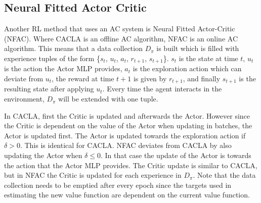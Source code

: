 
\subsection{Neural Fitted Actor Critic}
Another RL method that uses an AC system is Neural Fitted Actor-Critic (NFAC). Where CACLA is an offline AC algorithm, NFAC is an online AC algorithm. This means that a data collection $D_{\pi}$ is built which is filled with experience tuples of the form \{$s_{t}$, $u_{t}$, $a_{t}$, $r_{t+1}$, $s_{t+1}$\}. $s_{t}$ is the state at time $t$, $u_{t}$ is the action the Actor MLP provides, $a_{t}$ is the exploration action which can deviate from $u_{t}$, the reward at time $t+1$ is given by $r_{t+1}$, and finally $s_{t+1}$ is the resulting state after applying $u_{t}$. Every time the agent interacts in the environment, $D_{\pi}$ will be extended with one tuple.

In CACLA, first the Critic is updated and afterwards the Actor. However since the Critic is dependent on the value of the Actor when updating in batches, the Actor is updated first. The Actor is updated towards the exploration action if $\delta > 0$. This is identical for CACLA. NFAC deviates from CACLA by also updating the Actor when $\delta \leq 0$. In that case the update of the Actor is towards the action that the Actor MLP provides. The Critic update is similar to CACLA, but in NFAC the Critic is updated for each experience in $D_{\pi}$. Note that the data collection needs to be emptied after every epoch since the targets used in estimating the new value function are dependent on the current value function. 

